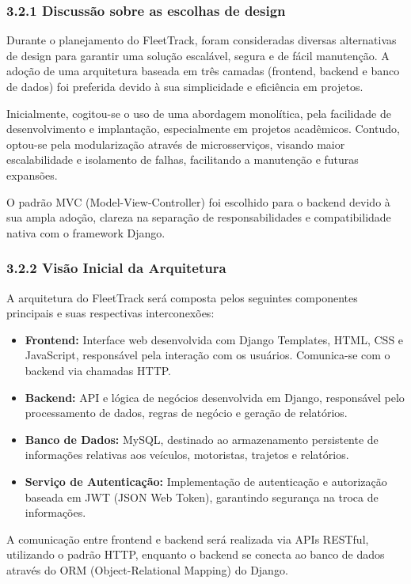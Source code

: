 \documentclass[12pt]{article}
\begin{document}
\subsubsection*{3.2.1 Discussão sobre as escolhas de design}

Durante o planejamento do FleetTrack, foram consideradas diversas alternativas de design para garantir uma solução escalável, segura e de fácil manutenção. A adoção de uma arquitetura baseada em três camadas (frontend, backend e banco de dados) foi preferida devido à sua simplicidade e eficiência em projetos. 

Inicialmente, cogitou-se o uso de uma abordagem monolítica, pela facilidade de desenvolvimento e implantação, especialmente em projetos acadêmicos. Contudo, optou-se pela modularização através de microsserviços, visando maior escalabilidade e isolamento de falhas, facilitando a manutenção e futuras expansões.

O padrão MVC (Model-View-Controller) foi escolhido para o backend devido à sua ampla adoção, clareza na separação de responsabilidades e compatibilidade nativa com o framework Django.

\subsubsection*{3.2.2 Visão Inicial da Arquitetura}

A arquitetura do FleetTrack será composta pelos seguintes componentes principais e suas respectivas interconexões:

\begin{itemize}
    \item \textbf{Frontend:} Interface web desenvolvida com Django Templates, HTML, CSS e JavaScript, responsável pela interação com os usuários. Comunica-se com o backend via chamadas HTTP.
    \item \textbf{Backend:} API e lógica de negócios desenvolvida em Django, responsável pelo processamento de dados, regras de negócio e geração de relatórios.
    \item \textbf{Banco de Dados:} MySQL, destinado ao armazenamento persistente de informações relativas aos veículos, motoristas, trajetos e relatórios.
    \item \textbf{Serviço de Autenticação:} Implementação de autenticação e autorização baseada em JWT (JSON Web Token), garantindo segurança na troca de informações.
\end{itemize}

A comunicação entre frontend e backend será realizada via APIs RESTful, utilizando o padrão HTTP, enquanto o backend se conecta ao banco de dados através do ORM (Object-Relational Mapping) do Django.
\end{document}
